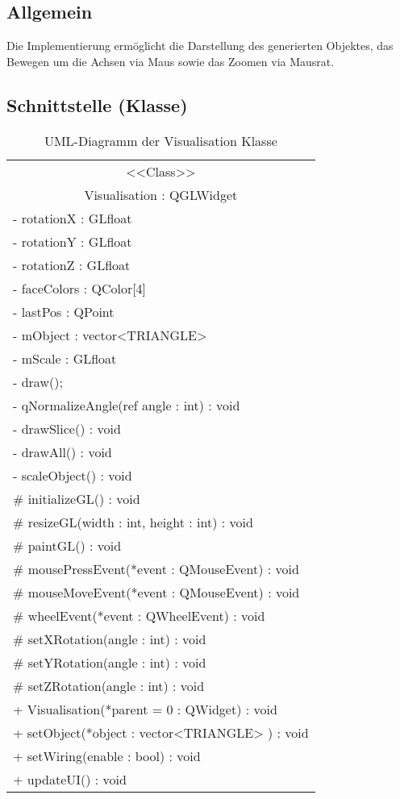\subsection{Allgemein}
Die Implementierung ermöglicht die Darstellung des generierten Objektes, das Bewegen um die Achsen via Maus sowie das Zoomen via Mausrat.
\subsection{Schnittstelle (Klasse)}
\begin{table}[H]
	\centering
	\caption{UML-Diagramm der Visualisation Klasse}
	\label{fig:visualisation}
	\begin{tabular}{|l|}
		\hline
		\multicolumn{1}{|c|}{<<Class>>} \\
		\multicolumn{1}{|c|}{Visualisation : QGLWidget} \\
		\hline
		- rotationX : GLfloat \\
		- rotationY : GLfloat \\
		- rotationZ : GLfloat \\
		- faceColors : QColor[4]\\
		- lastPos : QPoint\\
		- mObject : vector<TRIANGLE>\\
		- mScale : GLfloat\\
		- draw();\\
		- qNormalizeAngle(ref angle : int) : void\\
		- drawSlice() : void\\
		- drawAll() : void\\
		- scaleObject() : void\\
		\hline
		\# initializeGL() : void\\
		\# resizeGL(width : int, height : int) : void\\
		\# paintGL() : void\\
		\# mousePressEvent(*event : QMouseEvent) : void\\
		\# mouseMoveEvent(*event : QMouseEvent) : void\\
		\# wheelEvent(*event : QWheelEvent) : void\\
		\# setXRotation(angle : int) : void\\
		\# setYRotation(angle : int) : void\\
		\# setZRotation(angle : int) : void\\
		\hline
		+ Visualisation(*parent = 0 : QWidget) : void\\
		+ setObject(*object : vector<TRIANGLE> ) : void\\
		+ setWiring(enable : bool) : void\\
		+ updateUI() : void\\
		\hline
	\end{tabular}
\end{table}

